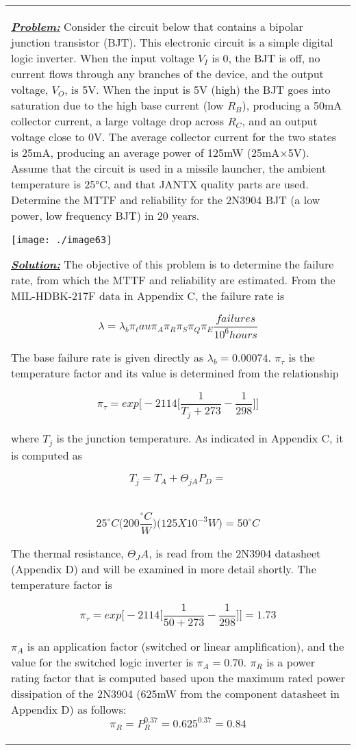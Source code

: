 {\begin{table}
\begin{tabular}{m{15cm}|}
\emph{\textbf{\ul{Problem:}}} Consider the circuit below that contains a
bipolar junction transistor (BJT). This electronic circuit is a simple
digital logic inverter. When the input voltage $V_I$ is 0, 
the BJT is off, no current
flows through any branches of the device, and the output voltage,
$V_O$, is 5V. When the input is 5V
(high) the BJT goes into saturation due to the high base current (low
$R_B$), producing a 50mA collector
current, a large voltage drop across $R_C$, and an output
voltage close to 0V. The average collector current for the two states is
25mA, producing an average power of 125mW (25mA×5V). Assume that the
circuit is used in a missile launcher, the ambient temperature is 25°C,
and that JANTX quality parts are used. Determine the MTTF and
reliability for the 2N3904 BJT (a low power, low frequency BJT) in 20
years.

\texttt{[image: ./image63]}


\emph{\textbf{\ul{Solution:}}} The objective of this problem is to
determine the failure rate, from which the MTTF and reliability are
estimated. From the MIL-HDBK-217F data in Appendix C, the failure rate
is


$$\lambda=\lambda_b \pi_tau \pi_A \pi_R \pi_S \pi_Q \pi_E \frac{failures}{10^6 hours}$$


The base failure rate is given directly as
$\lambda_b = 0.00074$.   $\pi_\tau$ is the temperature factor and
its value is determined from the relationship

$$\pi_\tau = exp \big[-2114 \big[ \frac{1}{T_j + 273} - \frac{1}{298} \big] \big]$$

where $T_j$ is the junction temperature. As
indicated in Appendix C, it is computed as

$$T_j = T_A + \Theta_{jA}P_D = $$ \\
$$		25^\circ C \big( 200 \frac{^\circ C}{W} \big) \big(125 X 10^{-3}W \big) = 50^\circ C $$

The thermal resistance, $\Theta_JA$, is read
from the 2N3904 datasheet (Appendix D) and will be examined in more
detail shortly. The temperature factor is

$$\pi_\tau = exp \big[-2114 \big[ \frac{1}{50 + 273} - \frac{1}{298} \big] \big] = 1.73$$

$\pi_A$ is an application factor
(switched or linear amplification), and the value for the switched logic
inverter is $\pi_A = 0.70$.  $\pi_R$ is a power rating factor that is
computed based upon the maximum rated power dissipation of the 2N3904
(625mW from the component datasheet in Appendix D) as follows:
$$\pi_R = P_R^{0.37} = 0.625^{0.37} = 0.84$$



\end{tabular}
\end{table}}
